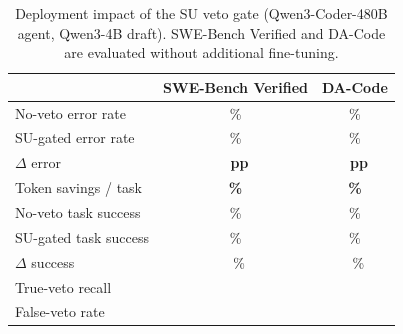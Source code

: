 \begin{table}[t]
\centering
\caption{Deployment impact of the SU veto gate (Qwen3-Coder-480B agent, Qwen3-4B draft).
SWE-Bench Verified and DA-Code are evaluated without additional fine-tuning.}
\label{tab:impact}
\small
\setlength{\tabcolsep}{4pt}
\renewcommand{\arraystretch}{1.1}
\begin{tabular}{@{}lcc@{}}
\toprule
& \textbf{SWE-Bench Verified} & \textbf{DA-Code} \\
\midrule
No-veto error rate     & \Hnumber{\impNoVetoErrSB}\%          & \Hnumber{\impNoVetoErrDA}\% \\
SU-gated error rate    & \Hnumber{\impGatedErrSB}\%           & \Hnumber{\impGatedErrDA}\% \\
$\Delta$ error         & \textbf{\Hnumber{$-$\impDeltaErrSB}~pp} & \textbf{\Hnumber{$-$\impDeltaErrDA}~pp} \\
Token savings / task   & \textbf{\Hnumber{$-$\impTokSaveSB}\%}  & \textbf{\Hnumber{$-$\impTokSaveDA}\%} \\
\midrule
No-veto task success   & \Hnumber{\impNoVetoSuccSB}\%          & \Hnumber{\impNoVetoSuccDA}\% \\
SU-gated task success  & \Hnumber{\impGatedSuccSB}\%          & \Hnumber{\impGatedSuccDA}\% \\
$\Delta$ success        & \Hnumber{$-$\impDeltaSuccSB}~\%        & \Hnumber{$-$\impDeltaSuccDA}~\% \\
\midrule
True-veto recall       & \Hnumber{\impRecallSB}          & \Hnumber{\impRecallDA} \\
False-veto rate        & \Hnumber{\impFvrSB}          & \Hnumber{\impFvrDA} \\
\bottomrule
\end{tabular}
\end{table}

